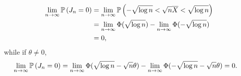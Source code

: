 \begin{ex}
\begin{enumerate}[(a)]
\begin{align*}
            \lim_{n\to\infty}\P{J_n=0}
             & =\lim_{n\to\infty}\P{-\sqrt{\log{n}}<\sqrt{n}\Xbar < \sqrt{\log{n}}}          \\
             & =\lim_{n\to\infty}\Phi(\sqrt{\log{n}})-\lim_{n\to\infty}\Phi(-\sqrt{\log{n}}) \\
             & =0,
          \end{align*}
          while if $\theta\neq 0$,
          \begin{align*}
            \lim_{n\to\infty}\P{J_n=0}
             & =\lim_{n\to\infty}\Phi(\sqrt{\log{n}}-\sqrt{n}\theta)
            -\lim_{n\to\infty}\Phi(-\sqrt{\log{n}}-\sqrt{n}\theta)
            =0.
          \end{align*}
  \end{enumerate}
\end{ex}

